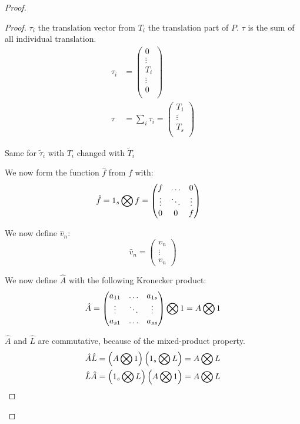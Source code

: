 \begin{proof}
\begin{proof}
$\tau_{i}$ the translation vector from $T_i$ the translation part of $P$.
$\tau$ is the sum of all individual translation.
\begin{align}
	\tau_i&=\begin{pmatrix}
			0\\
			\vdots\\
			T_{i}\\
			\vdots\\
			0\\
	\end{pmatrix}
	\\
	\tau&=\sum_{i}\tau_{i}=\begin{pmatrix}
			T_{1}\\
			\vdots\\
			T_{s}\\
	\end{pmatrix}
\end{align}

Same for $\tilde{\tau}_{i}$ with $T_{i}$ changed with $\tilde{T}_i$

We now form the function $\hat{f}$ from $f$ with:
\begin{align}
\hat{f}&=1_{s}\bigotimes f=\begin{pmatrix}f	&\ldots	&0\\
			\vdots &\ddots 	&\vdots\\
			0	&0	&f\\
	\end{pmatrix}
\end{align}

We now define $\hat{v}_n$:
\begin{equation}
\hat{v}_{n}=\begin{pmatrix}
	      v_{n}\\
	      \vdots\\
	      v_{n}
	      \end{pmatrix}
\end{equation}

We now define $\hat{A}$ with the following Kronecker product:
\begin{equation}
\hat{A}=\begin{pmatrix}
    a_{11}	&\ldots	&a_{1s}\\
    \vdots	&\ddots	&\vdots\\
    a_{s1}	&\ldots	&a_{ss}\\
  \end{pmatrix} \bigotimes 1=A \bigotimes 1
\end{equation}

$\hat{A}$ and $\hat{L}$ are commutative, because of the mixed-product property.
\begin{align}
\hat{A}\hat{L}&=\left(A\bigotimes 1 \right)
  \left(1_{s}\bigotimes L\right)=
	A\bigotimes L\\
    \hat{L}\hat{A}&=
  \left(1_{s}\bigotimes L\right)
	\left(A \bigotimes 1 \right)=
	A\bigotimes L
\end{align}


\end{proof}
\end{proof}
